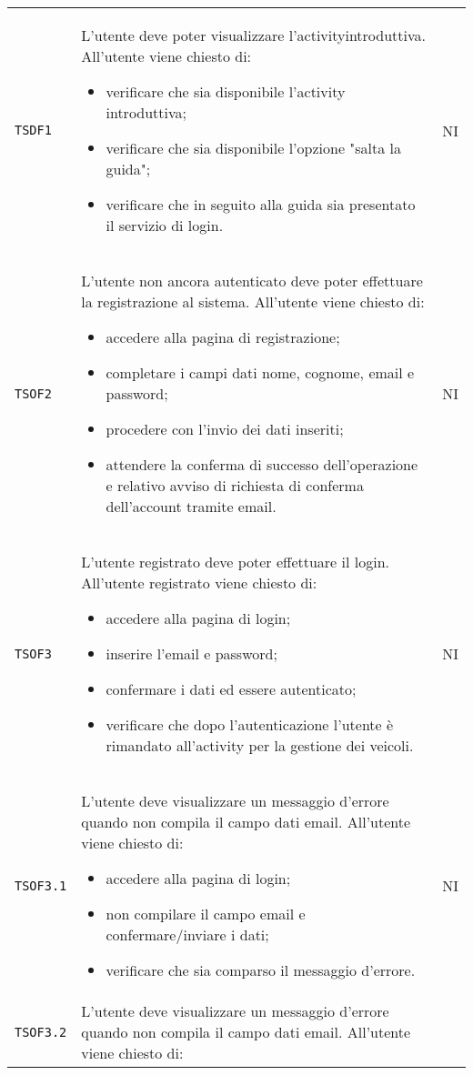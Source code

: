 \begin{longtable}{ >{\centering}p{} >{\centering}p{}
			>{\centering}p{}}
		 \texttt{TSDF1}	&	L'utente deve poter visualizzare l'activity\glosp introduttiva. All'utente viene chiesto di:
		 \begin{itemize}
		 	\item verificare che sia disponibile l'activity introduttiva;
		 	\item verificare che sia disponibile l'opzione "salta la guida";
		 	\item verificare che in seguito alla guida sia presentato il servizio di login. 
		 \end{itemize}	&	NI	\tabularnewline
		 \texttt{TSOF2}	&	L'utente non ancora autenticato deve poter effettuare la registrazione al sistema. All'utente viene chiesto di:
		 \begin{itemize}
		 	\item accedere alla pagina di registrazione;
		 	\item completare i campi dati nome, cognome, email e password;
		 	\item procedere con l'invio dei dati inseriti;
		 	\item attendere la conferma di successo dell'operazione e relativo avviso di richiesta di conferma dell'account tramite email.
		 \end{itemize}	&	NI	\tabularnewline
		 \texttt{TSOF3}	&	L'utente registrato deve poter effettuare il login. All'utente registrato viene chiesto di:
		 \begin{itemize}
		 	\item accedere alla pagina di login;
		 	\item inserire l'email e password;
		 	\item confermare i dati ed essere autenticato;
		 	\item verificare che dopo l'autenticazione l'utente è rimandato all'activity per la gestione dei veicoli.
		 \end{itemize}	&	NI	\tabularnewline
		 \texttt{TSOF3.1}	&	L'utente deve visualizzare un messaggio d'errore quando non compila il campo dati email. All'utente viene chiesto di:
		 \begin{itemize}
		 	\item accedere alla pagina di login;
		 	\item non compilare il campo email e confermare/inviare i dati;
		 	\item verificare che sia comparso il messaggio d'errore.
		 \end{itemize}	&	NI	\tabularnewline
		 \texttt{TSOF3.2}	&	L'utente deve visualizzare un messaggio d'errore quando non compila il campo dati email. All'utente viene chiesto di:

\end{longtable}
